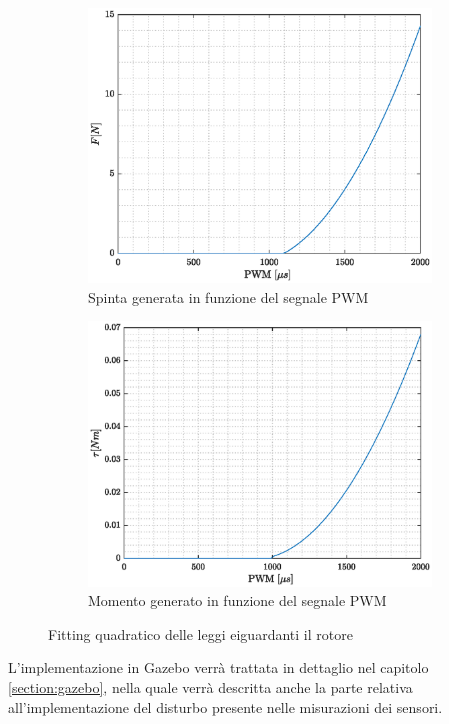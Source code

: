 \begin{figure}
	\centering
	\begin{subfigure}{0.45\textwidth}
		\centering
		\includegraphics[width=1\textwidth]{SistemaQuadrirotore/Figure/ForzaPWM}
		\caption{Spinta generata in funzione del segnale PWM}
	\end{subfigure}
	\hfill
	\begin{subfigure}{0.45\textwidth}
		\centering
		\includegraphics[width=1\textwidth]{SistemaQuadrirotore/Figure/MomentoPWM}
		\caption{Momento generato in funzione del segnale PWM}
	\end{subfigure}
	\caption{Fitting quadratico delle leggi eiguardanti il rotore}
	\label{fig:pwmTM}
\end{figure}
 
L'implementazione in Gazebo verrà trattata in dettaglio nel capitolo \ref{section:gazebo}, nella quale verrà descritta anche la parte relativa all'implementazione del disturbo presente nelle misurazioni dei sensori.